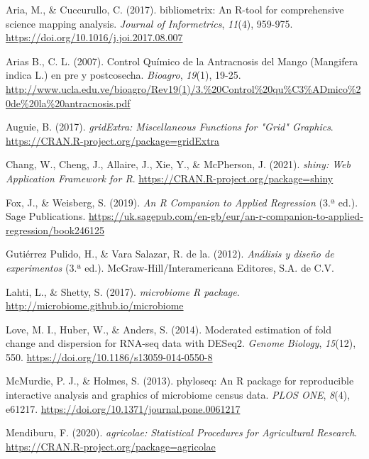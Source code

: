 \documentclass[
  spanish,
  letterpaper,
  DIV=11,
  numbers=noendperiod]{scrreprt}
\newlength{\cslhangindent}
\newenvironment{CSLReferences}[2] %
 {\begin{list}{}{%
  \setlength{\itemindent}{0pt}
  \setlength{\leftmargin}{0pt}
  \setlength{\parsep}{0pt}
  \ifodd #1
   \setlength{\leftmargin}{\cslhangindent}
   \setlength{\itemindent}{-1\cslhangindent}
  \fi
  \setlength{\itemsep}{#2\baselineskip}}}
 {\end{list}}
\begin{document}
\label{refs}
\begin{CSLReferences}{1}{0}
Aria, M., \& Cuccurullo, C. (2017). {bibliometrix: An R-tool for
comprehensive science mapping analysis}. \emph{Journal of Informetrics},
\emph{11}(4), 959-975. \url{https://doi.org/10.1016/j.joi.2017.08.007}

Arias B., C. L. (2007). Control Qu{í}mico de la Antracnosis del Mango
({Mangifera indica L.}) en pre y postcosecha. \emph{Bioagro},
\emph{19}(1), 19-25.
\url{http://www.ucla.edu.ve/bioagro/Rev19(1)/3.\%20Control\%20qu\%C3\%ADmico\%20de\%20la\%20antracnosis.pdf}

Auguie, B. (2017). \emph{{gridExtra: Miscellaneous Functions for "Grid"
Graphics}}. \url{https://CRAN.R-project.org/package=gridExtra}

Chang, W., Cheng, J., Allaire, J., Xie, Y., \& McPherson, J. (2021).
\emph{shiny: Web Application Framework for R}.
\url{https://CRAN.R-project.org/package=shiny}

Fox, J., \& Weisberg, S. (2019). \emph{{An R Companion to Applied
Regression}} (3.ª ed.). Sage Publications.
\url{https://uk.sagepub.com/en-gb/eur/an-r-companion-to-applied-regression/book246125}

Gutiérrez Pulido, H., \& Vara Salazar, R. de la. (2012).
\emph{An{á}lisis y dise{ñ}o de experimentos} (3.ª ed.).
McGraw-Hill/Interamericana Editores, S.A. de C.V.

Lahti, L., \& Shetty, S. (2017). \emph{{microbiome R package}}.
\url{http://microbiome.github.io/microbiome}

Love, M. I., Huber, W., \& Anders, S. (2014). {Moderated estimation of
fold change and dispersion for RNA-seq data with DESeq2}. \emph{Genome
Biology}, \emph{15}(12), 550.
\url{https://doi.org/10.1186/s13059-014-0550-8}

McMurdie, P. J., \& Holmes, S. (2013). {phyloseq: An R package for
reproducible interactive analysis and graphics of microbiome census
data}. \emph{PLOS ONE}, \emph{8}(4), e61217.
\url{https://doi.org/10.1371/journal.pone.0061217}

Mendiburu, F. (2020). \emph{agricolae: Statistical Procedures for
Agricultural Research}.
\url{https://CRAN.R-project.org/package=agricolae}


\end{CSLReferences}
\end{document}
